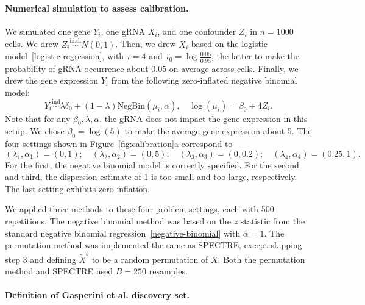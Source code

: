 \documentclass{nature}
\begin{document}
\paragraph{Numerical simulation to assess calibration.}

We simulated one gene $Y_i$, one gRNA $X_i$, and one confounder $Z_i$ in $n = 1000$ cells. We drew $Z_i \overset{\text{i.i.d.}}\sim N(0,1)$. Then, we drew $X_i$ based on the logistic model~\eqref{logistic-regression}, with $\tau = 4$ and $\tau_0 = \log \frac{0.05}{0.95}$, the latter to make the probability of gRNA occurrence about $0.05$ on average across cells. Finally, we drew the gene expression $Y_i$ from the following zero-inflated negative binomial model:
\begin{equation*}
Y_i \overset{\text{ind}}\sim \lambda \delta_0 + (1-\lambda)\text{NegBin}(\mu_i, \alpha), \quad \log(\mu_i) = \beta_0 + 4Z_i.
\end{equation*}
Note that for any $\beta_0,\lambda,\alpha$, the gRNA does not impact the gene expression in this setup. We chose $\beta_0 = \log(5)$ to make the average gene expression about 5. The four settings shown in Figure~\ref{fig:calibration}a correspond to 
\begin{equation*}
(\lambda_1, \alpha_1) = (0,1); \quad (\lambda_2, \alpha_2) = (0,5); \quad (\lambda_3, \alpha_3) = (0,0.2); \quad (\lambda_4, \alpha_4) = (0.25,1).
\end{equation*}
For the first, the negative binomial model is correctly specified. For the second and third, the dispersion estimate of 1 is too small and too large, respectively. The last setting exhibits zero inflation. 

We applied three methods to these four problem settings, each with 500 repetitions. The negative binomial method was based on the $z$ statistic from the standard negative binomial regression~\eqref{negative-binomial} with $\alpha = 1$. The permutation method was implemented the same as SPECTRE, except skipping step 3 and defining $\widetilde X^b$ to be a random permutation of $X$. Both the permutation method and SPECTRE used $B = 250$ resamples.


 

\paragraph{Definition of Gasperini et al. discovery set.}
\end{document}
